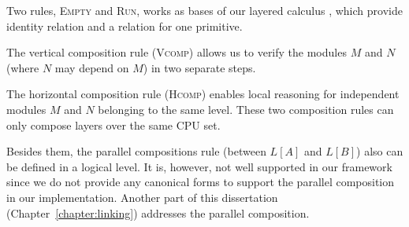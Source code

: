 Two rules, \textsc{Empty} and \textsc{Run}, works as bases of our layered calculus , which 
provide identity relation and a relation for one primitive. 

The vertical composition rule (\textsc{Vcomp}) allows us
to verify the modules $M$ and $N$ (where $N$ may depend on $M$) 
in two separate steps.
    \begin{mathpar}
\end{mathpar}

The horizontal composition rule
(\textsc{Hcomp}) enables local reasoning for independent
modules $M$ and $N$ belonging to the same level. These two composition rules can only compose layers over the same  CPU set.
 \begin{mathpar}
\end{mathpar}

Besides them, 
the parallel compositions rule (between $L[A]$ and $L[B]$) 
also can be defined in a logical level. 
It is, however, not well supported in our framework since we do not provide
any canonical forms to support the parallel composition 
in our implementation.
Another part of this dissertation (Chapter~\ref{chapter:linking}) addresses 
the parallel composition. 


